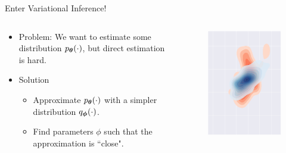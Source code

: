 \documentclass{beamer}
\begin{document}
\begin{frame}{Enter Variational Inference!}
    \begin{columns}[T]
        \begin{column}{.7\textwidth}
            \begin{itemize}
                \item {
                    Problem: We want to estimate some distribution $p_{\boldsymbol{\theta}}(\cdot)$, but direct estimation is hard.
                }
                \item{
                    Solution
                    \begin{itemize}
                        \item {
                            Approximate $p_{\boldsymbol{\theta}}(\cdot)$ with a simpler distribution $q_{\boldsymbol{\phi}}(\cdot)$.
                        }
                        \item {
                            Find parameters $\phi$ such that the approximation is ``close".
                        }
                    \end{itemize}
                }
            \end{itemize}
        \end{column}
        \begin{column}{.3\textwidth}
            \begin{figure}
                \centering
                \includegraphics[width=\textwidth]{dist2}

\end{figure}
\end{column}
\end{columns}
\end{frame}
\end{document}
